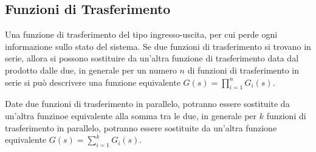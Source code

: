 \documentclass{article}
\numberwithin{equation}{subsection}
\begin{document}
\subsection{Funzioni di Trasferimento}
Una funzione di trasferimento del tipo ingresso-uscita, per cui perde ogni informazione sullo stato del sistema.
Se due funzioni di trasferimento si trovano in serie, allora si possono sostituire da un'altra funzione di trasferimento data dal prodotto dalle due, 
in generale per un numero $n$ di funzioni di trasferimento in serie si può descrivere una funzione equivalente $G(s)=\prod_{i=1}^nG_i(s)$. 

\begin{center}
\end{center}
\vspace{0.25cm}
\begin{center}
\end{center}

Date due funzioni di trasferimento in parallelo, potranno essere sostituite da un'altra funzinoe equivalente alla somma tra le due, in generale 
per $k$ funzioni di trasferimento in parallelo, potranno essere sostituite da un'altra funzione equivalente $G(s)=\sum_{i=1}^kG_i(s)$. 
\end{document}
